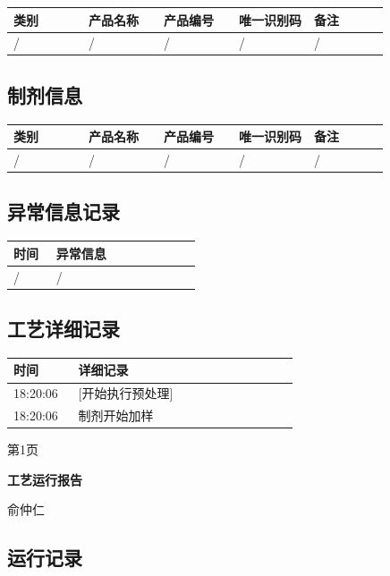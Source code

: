 \documentclass[UTF8,10pt,a4paper,fontset=fandol]{ctexart}
\newcommand{\handwritten}[1]{#1}
\begin{document}
\begin{center}
\begin{minipage}[t]{0.47\linewidth}
\begin{tabular}{|p{0.20\linewidth}|p{0.20\linewidth}|p{0.20\linewidth}|p{0.20\linewidth}|p{0.20\linewidth}|}
\hline
类别 & 产品名称 & 产品编号 & 唯一识别码 & 备注 \\ \hline
/ & / & / & / & / \\ \hline
\end{tabular}

\subsection*{制剂信息}

\begin{tabular}{|p{0.20\linewidth}|p{0.20\linewidth}|p{0.20\linewidth}|p{0.20\linewidth}|p{0.20\linewidth}|}
\hline
类别 & 产品名称 & 产品编号 & 唯一识别码 & 备注 \\ \hline
/ & / & / & / & / \\ \hline
\end{tabular}

\subsection*{异常信息记录}

\begin{tabular}{|p{0.20\linewidth}|p{0.68\linewidth}|}
\hline
时间 & 异常信息 \\ \hline
/ & / \\ \hline
\end{tabular}

\subsection*{工艺详细记录}

\begin{tabular}{|p{0.20\linewidth}|p{0.68\linewidth}|}
\hline
时间 & 详细记录 \\ \hline
18:20:06 & [开始执行预处理] \\ \hline
18:20:06 & 制剂开始加样 \\ \hline
\end{tabular}

\vfill
第1页
\end{minipage}
\hfill
\begin{minipage}[t]{0.47\linewidth}
\centering
\textbf{工艺运行报告}

\handwritten{俞仲仁}

\subsection*{运行记录}


\end{minipage}
\end{center}
\end{document}
